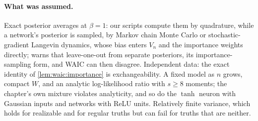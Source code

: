 \begin{refsection}
\paragraph{What was assumed.} Exact posterior averages at $\beta=1$: our scripts compute them by quadrature, while a network's posterior is sampled, by Markov chain Monte Carlo or stochastic-gradient Langevin dynamics, whose bias enters $V_n$ and the importance weights directly; \textcite[Section~5.2]{Watanabe2010} warns that leave-one-out from separate posteriors, its importance-sampling form, and WAIC can then disagree. Independent data: the exact identity of \cref{lem:waic:importance} is exchangeability. A fixed model as $n$ grows, compact $W$, and an analytic log-likelihood ratio with $s\ge8$ moments; the chapter's own mixture violates analyticity, and so do the $\tanh$ neuron with Gaussian inputs and networks with ReLU units. Relatively finite variance, which holds for realizable and for regular truths but can fail for truths that are neither.


\end{refsection}
